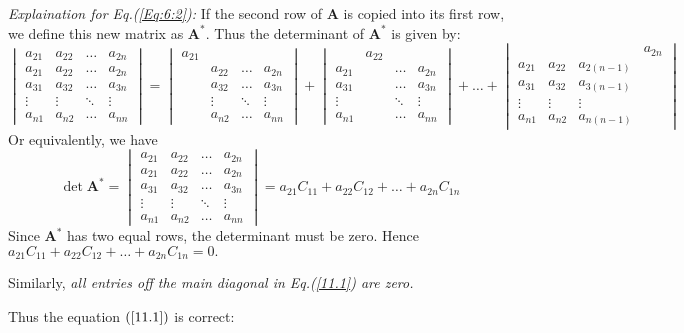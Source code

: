 \begin{itemize}
\textit{Explaination for Eq.(\ref{Eq:6:2}): }
If the second row of $\bm A$ is copied into its first row, we define this new matrix as $\bm A^{*}$. Thus the determinant of $\bm A^{*}$ is given by:
\[
\begin{vmatrix}
a_{21}&a_{22}&\dots&a_{2n}\\
a_{21}&a_{22}&\dots&a_{2n}\\
a_{31}&a_{32}&\dots&a_{3n}\\
\vdots&\vdots&\ddots&\vdots\\
a_{n1}&a_{n2}&\dots&a_{nn}
\end{vmatrix}
=
\begin{vmatrix}
a_{21}&&&\\
&a_{22}&\dots&a_{2n}\\
&a_{32}&\dots&a_{3n}\\
&\vdots&\ddots&\vdots\\
&a_{n2}&\dots&a_{nn}
\end{vmatrix}
+
\begin{vmatrix}
&a_{22}&&\\
a_{21}&&\dots&a_{2n}\\
a_{31}&&\dots&a_{3n}\\
\vdots&&\ddots&\vdots\\
a_{n1}&&\dots&a_{nn}
\end{vmatrix}
+\dots+
\begin{vmatrix}
&&&a_{2n}\\
a_{21}&a_{22}&a_{2(n-1)}&\\
a_{31}&a_{32}&a_{3(n-1)}&\\
\vdots&\vdots&\vdots&\\
a_{n1}&a_{n2}&a_{n(n-1)}&
\end{vmatrix}
\]
Or equivalently, we have
\[\det\bm A^{*}=
\begin{vmatrix}
a_{21}&a_{22}&\dots&a_{2n}\\
a_{21}&a_{22}&\dots&a_{2n}\\
a_{31}&a_{32}&\dots&a_{3n}\\
\vdots&\vdots&\ddots&\vdots\\
a_{n1}&a_{n2}&\dots&a_{nn}
\end{vmatrix}
=a_{21}C_{11}+a_{22}C_{12}+\dots+a_{2n}C_{1n}
\]
Since $\bm A^{*}$ has two equal rows, the determinant must be zero. Hence $a_{21}C_{11}+a_{22}C_{12}+\dots+a_{2n}C_{1n}=0.$

Similarly, \emph{all entries off the main diagonal in Eq.(\ref{11.1}) are zero.}
\end{itemize}	
Thus the equation $(\ref{11.1})$ is correct:
